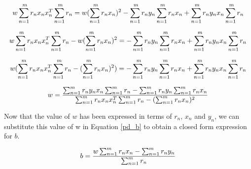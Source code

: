 \documentclass[a4paper]{article}
\begin{document}
$$w \sum_{n=1}^{\\m}r_n x_n x_n^T \sum_{n=1}^{\\m} r_n  = w ({\sum_{n=1}^{\\m}r_n x_n})^2 - \sum_{n=1}^{\\m} r_n y_n \sum_{n=1}^{\\m} r_n x_n + \sum_{n=1}^{\\m} r_n y_n x_n \sum_{n=1}^{\\m} r_n$$

$$w \sum_{n=1}^{\\m}r_n x_n x_n^T \sum_{n=1}^{\\m} r_n - w ({\sum_{n=1}^{\\m}r_n x_n})^2 = - \sum_{n=1}^{\\m} r_n y_n \sum_{n=1}^{\\m} r_n x_n + \sum_{n=1}^{\\m} r_n y_n x_n \sum_{n=1}^{\\m} r_n$$

$$w (\sum_{n=1}^{\\m}r_n x_n x_n^T \sum_{n=1}^{\\m} r_n - ({\sum_{n=1}^{\\m}r_n x_n})^2) = - \sum_{n=1}^{\\m} r_n y_n \sum_{n=1}^{\\m} r_n x_n + \sum_{n=1}^{\\m} r_n y_n x_n \sum_{n=1}^{\\m} r_n$$

\begin{equation}
\label{cf_w}
w  = \frac{\sum_{n=1}^{\\m} r_n y_n x_n \sum_{n=1}^{\\m} r_n - \sum_{n=1}^{\\m} r_n y_n \sum_{n=1}^{\\m} r_n x_n}{\sum_{n=1}^{\\m}r_n x_n x_n^T \sum_{n=1}^{\\m} r_n - ({\sum_{n=1}^{\\m}r_n x_n})^2}
\end{equation}

\vspace{10mm}

Now that the value of $w$ has been expressed in terms of $r_n$, $x_n$ and $y_n$, we can substitute this value of w in Equation \ref{pd_b} to obtain a closed form expression for $b$.

$$b = \frac{w \sum_{n=1}^{\\m}r_n x_n - \sum_{n=1}^{\\m} r_n y_n}{\sum_{n=1}^{\\m} r_n} $$
\end{document}
